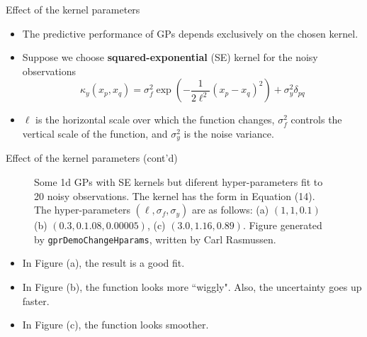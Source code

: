 \documentclass[10pt,mathserif]{beamer}
\begin{document}
\begin{frame}{Effect of the kernel parameters}
\begin{itemize}
    \item The predictive performance of GPs depends exclusively on the chosen kernel.
    \item Suppose we choose \textbf{squared-exponential} (SE) kernel for the noisy observations
    \begin{equation*}
        \kappa_y (x_p, x_q) = \sigma_f^2 \exp(- \frac{1}{2\ell^2} (x_p - x_q)^2) + \sigma_y^2 \delta_{pq}
    \end{equation*}
    \item $\ell$ is the horizontal scale over which the function changes, $\sigma_f^2$  controls the vertical scale of the function, and $\sigma_y^2$ is the noise variance.
\end{itemize}    
\end{frame}

\begin{frame}{Effect of the kernel parameters (cont'd)}
\begin{figure}[h]
\centering
{}
\caption{Some 1d GPs with SE kernels but diferent hyper-parameters fit to 20 noisy observations. The kernel has the form in Equation (14). The hyper-parameters $(\ell, \sigma_f , \sigma_y)$ are as follows: (a) $(1,1,0.1)$ (b) $(0.3, 0.1.08, 0.00005)$, (c) $(3.0, 1.16, 0.89)$. Figure generated by \texttt{gprDemoChangeHparams}, written by Carl Rasmussen.}
\end{figure}
\begin{itemize}
    \item In Figure (a), the result is a good fit. 
    \item In Figure (b), the function looks more ``wiggly". Also, the uncertainty goes up faster.
    \item In Figure (c), the function looks smoother.
\end{itemize}
\end{frame}
\end{document}
